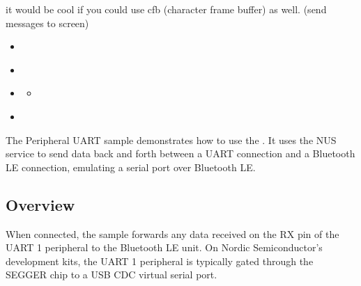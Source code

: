 \documentclass[letterpaper,10pt,english]{sphinxmanual}
\begin{document}
it would be cool if you could use cfb (character frame buffer) as well. (send messages to screen)

\begin{sphinxShadowBox}
\begin{itemize}
\item {} 
\label{\detokenize{samples/peripheral_uart/README:id3}}{\hyperref[\detokenize{samples/peripheral_uart/README:overview}]{}}

\item {} 
\label{\detokenize{samples/peripheral_uart/README:id4}}{\hyperref[\detokenize{samples/peripheral_uart/README:debugging}]{}}

\item {} 
\label{\detokenize{samples/peripheral_uart/README:id5}}{\hyperref[\detokenize{samples/peripheral_uart/README:building-and-running}]{}}
\begin{itemize}
\item {} 
\label{\detokenize{samples/peripheral_uart/README:id6}}{\hyperref[\detokenize{samples/peripheral_uart/README:testing}]{}}

\end{itemize}

\item {} 
\label{\detokenize{samples/peripheral_uart/README:id7}}{\hyperref[\detokenize{samples/peripheral_uart/README:dependencies}]{}}

\end{itemize}
\end{sphinxShadowBox}

The Peripheral UART sample demonstrates how to use the .
It uses the NUS service to send data back and forth between a UART connection and a Bluetooth LE connection, emulating a serial port over Bluetooth LE.


\subsection{Overview}
\label{\detokenize{samples/peripheral_uart/README:overview}}
When connected, the sample forwards any data received on the RX pin of the UART 1 peripheral to the Bluetooth LE unit.
On Nordic Semiconductor’s development kits, the UART 1 peripheral is typically gated through the SEGGER chip to a USB CDC virtual serial port.
\end{document}
